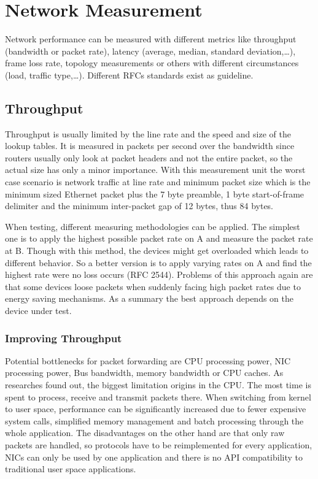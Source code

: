 
\section{Network Measurement}
Network performance can be measured with different metrics like throughput (bandwidth or packet rate), latency (average, median, standard deviation,\dots), frame loss rate, topology measurements or others with different circumstances (load, traffic type,\dots).
Different RFCs standards exist as guideline.

\subsection{Throughput}
Throughput is usually limited by the line rate and the speed and size of the lookup tables.
It is measured in packets per second over the bandwidth since routers usually only look at packet headers and not the entire packet, so the actual size has only a minor importance.
With this measurement unit the worst case scenario is network traffic at line rate and minimum packet size which is the minimum sized Ethernet packet plus the 7 byte preamble, 1 byte start-of-frame delimiter and the minimum inter-packet gap of 12 bytes, thus 84 bytes.\\
\vspace{5pt}

When testing, different measuring methodologies can be applied.
The simplest one is to apply the highest possible packet rate on A and measure the packet rate at B.
Though with this method, the devices might get overloaded which leads to different behavior.
So a better version is to apply varying rates on A and find the highest rate were no loss occurs (RFC 2544).
Problems of this approach again are that some devices loose packets when suddenly facing high packet rates due to energy saving mechanisms.
As a summary the best approach depends on the device under test.

\subsubsection*{Improving Throughput}
Potential bottlenecks for packet forwarding are CPU processing power, NIC processing power, Bus bandwidth, memory bandwidth or CPU caches.
As researches found out, the biggest limitation origins in the CPU.
The most time is spent to process, receive and transmit packets there.
When switching from kernel to user space, performance can be significantly increased due to fewer expensive system calls, simplified memory management and batch processing through the whole application.
The disadvantages on the other hand are that only raw packets are handled, so protocols have to be reimplemented for every application, NICs can only be used by one application and there is no API compatibility to traditional user space applications.

